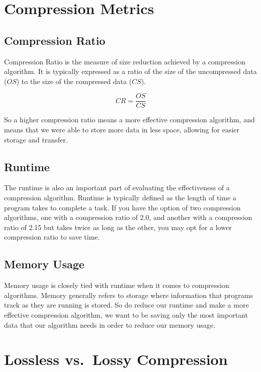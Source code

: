 \documentclass[12pt,twoside]{reedthesis}
\begin{document}
\hypertarget{compression-metrics}{%
\section{Compression Metrics}\label{compression-metrics}}

\hypertarget{compression-ratio}{%
\subsection{Compression Ratio}\label{compression-ratio}}

Compression Ratio is the measure of size reduction achieved by a compression algorithm. It is typically expressed as a ratio of the size of the uncompressed data (\(OS\)) to the size of the compressed data (\(CS\)).

\[CR = \frac{OS}{CS}\]

So a higher compression ratio means a more effective compression algorithm, and means that we were able to store more data in less space, allowing for easier storage and transfer.

\hypertarget{runtime}{%
\subsection{Runtime}\label{runtime}}

The runtime is also an important part of evaluating the effectiveness of a compression algorithm. Runtime is typically defined as the length of time a program takes to complete a task. If you have the option of two compression algorithms, one with a compression ratio of 2.0, and another with a compression ratio of 2.15 but takes twice as long as the other, you may opt for a lower compression ratio to save time.

\hypertarget{memory-usage}{%
\subsection{Memory Usage}\label{memory-usage}}

Memory usage is closely tied with runtime when it comes to compression algorithms. Memory generally refers to storage where information that programs track as they are running is stored. So do reduce our runtime and make a more effective compression algorithm, we want to be saving only the most important data that our algorithm needs in order to reduce our memory usage.

\hypertarget{lossless-vs.-lossy-compression}{%
\section{Lossless vs.~Lossy Compression}\label{lossless-vs.-lossy-compression}}
\end{document}
